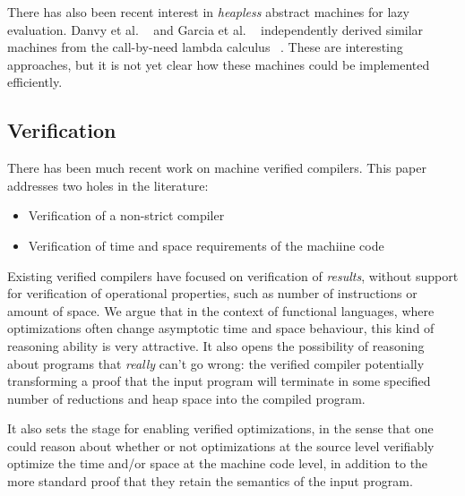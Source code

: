 There has also been recent interest in \emph{heapless} abstract
machines for lazy evaluation. Danvy et al. ~\cite{danvy2012inter} and
Garcia et al. ~\cite{garcia2009lazy} independently derived similar
machines from the call-by-need lambda calculus
~\cite{ariola1995call}. These are interesting approaches, but it is not yet
clear how these machines could be implemented efficiently.

\subsection{Verification}
There has been much recent work on machine verified compilers. This paper
addresses two holes in the literature: 
\begin{itemize}
\item Verification of a non-strict compiler
\item Verification of time and space requirements of the machiine code 
\end{itemize}
Existing verified compilers have focused on verification of \emph{results},
without support for verification of operational properties, such as number of
instructions or amount of space. We argue that in the context of functional
languages, where optimizations often change asymptotic time and space behaviour,
this kind of reasoning ability is very attractive. It also opens the possibility
of reasoning about programs that \emph{really} can't go wrong: the verified
compiler potentially transforming a proof that the input program will terminate
in some specified number of reductions and heap space into the compiled program.

It also sets the stage for enabling verified optimizations, in the sense that
one could reason about whether or not optimizations at the source level
verifiably optimize the time and/or space at the machine code level, in addition
to the more standard proof that they retain the semantics of the input program. 

